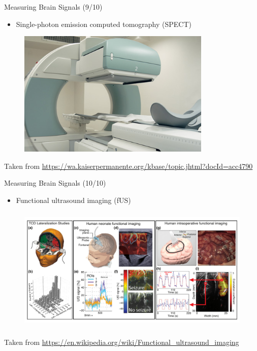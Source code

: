 \documentclass{beamer}
\begin{document}
\begin{frame}
{\centerline{Measuring Brain Signals (9/10)}}
\begin{itemize}
    \item Single-photon emission computed tomography (SPECT)
\end{itemize}
\begin{figure}
    \centering
    \includegraphics[height=6cm]{P2023.AIBCCSS.BrainSignals/spect.jpg}
\end{figure}
\begin{center}
    \tiny{Taken from \url{https://wa.kaiserpermanente.org/kbase/topic.jhtml?docId=acc4790}}
\end{center}    
\end{frame}

\begin{frame}
{\centerline{Measuring Brain Signals (10/10)}}
\begin{itemize}
    \item Functional ultrasound imaging (fUS)
\end{itemize}
\begin{figure}
    \centering
    \includegraphics[height=6cm]{P2023.AIBCCSS.BrainSignals/fui.png}
\end{figure}
\begin{center}
    \tiny{Taken from \url{https://en.wikipedia.org/wiki/Functional_ultrasound_imaging}}
\end{center}    
\end{frame}
\end{document}

